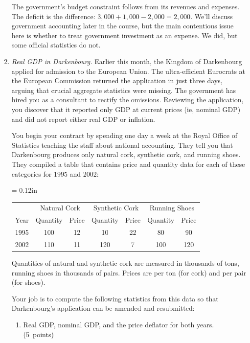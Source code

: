 \documentclass[letterpaper,12pt]{article}
\begin{document}
\begin{enumerate}
The government's budget constraint follows from its revenues and
expenses.  The deficit is the difference: $3,000 + 1,000-2,000=
2,000$.  We'll discuss government accounting later in the course,
but the main contentious issue here is whether to treat government
investment as an expense.  We did, but some official statistics do
not.


\item {\it Real GDP in Darkenbourg.}  
Earlier this month, the
Kingdom of Darkenbourg applied for admission to the European
Union. The ultra-efficient Eurocrats at the European Commission
returned the application in just three days, arguing that crucial
aggregate statistics were missing. The government has hired you as
a consultant to rectify the omissions. Reviewing the application,
you discover that it reported only GDP at current prices (ie,
nominal GDP) and did not report either real GDP or inflation.

You begin your contract by spending one day a week at the Royal
Office of Statistics teaching the staff about national accounting.
They tell you that Darkenbourg produces only natural cork,
synthetic cork, and running shoes.  They compiled a table that
contains price and quantity data for each of these categories for
1995 and 2002:
\begin{center}
\tabcolsep = 0.12in
\begin{tabular}{lcccccc}
\hline\hline%
     &\multicolumn{2}{c}{Natural Cork}&\multicolumn{2}{c}{Synthetic Cork} &\multicolumn{2}{c}{Running Shoes}\\%
\cline{2-7}%
Year &   Quantity & Price   & Quantity &    Price   &  Quantity & Price    \\
\hline\hline%
1995 &     100    & 12 & 10 & 22 & 80  & 90  \\%
2002 &     110    & 11 & 120 & 7 & 100 & 120 \\%
\hline\hline%
\end{tabular}
\end{center}
Quantities of natural and synthetic cork are measured in thousands
of tons, running shoes in thousands of pairs. Prices are per ton
(for cork) and per pair (for shoes).

Your job is to compute the following statistics from this data so
that Darkenbourg's application can be amended and resubmitted:
%
\begin{enumerate}
\item Real GDP, nominal GDP, and the price deflator for both
years. (5~points)


\end{enumerate}
\end{enumerate}
\end{document}
